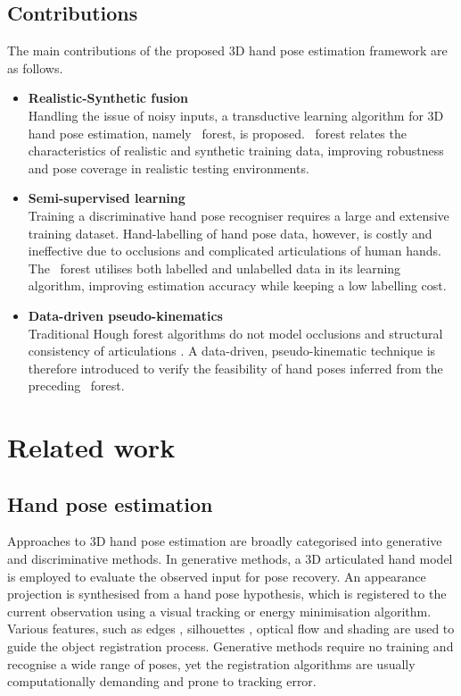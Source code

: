 \subsection{Contributions} 
The main contributions of the proposed 3D hand pose estimation framework are as follows. 

\begin{itemize}
\item{\textbf{Realistic-Synthetic fusion}}\\
Handling the issue of noisy inputs, a transductive learning algorithm for 3D hand pose estimation, namely \STR\ forest, is proposed. \STR\ forest relates the characteristics of realistic and synthetic training data, improving robustness and pose coverage in realistic testing environments.
\item{\textbf{Semi-supervised learning}}\\
Training a discriminative hand pose recogniser requires a large and extensive training dataset. Hand-labelling of hand pose data, however, is costly and ineffective due to occlusions and complicated articulations of human hands. 
The \STR\ forest utilises both labelled and unlabelled data in its learning algorithm, improving estimation accuracy while keeping a low labelling cost. 
\item{\textbf{Data-driven pseudo-kinematics}}\\
	Traditional Hough forest algorithms do not model occlusions and structural consistency of articulations \cite{Gall2009}. A data-driven, pseudo-kinematic technique is therefore introduced to verify the feasibility of hand poses inferred from the preceding \STR\ forest.  
\end{itemize} 

\section{Related work}

\subsection{Hand pose estimation}

Approaches to 3D hand pose estimation are broadly categorised into generative and discriminative methods. In generative methods, a 3D articulated hand model is employed to evaluate the observed input for pose recovery. An appearance projection is synthesised from a hand pose hypothesis, which is registered to the current observation using a visual tracking or energy minimisation algorithm. Various features, such as edges \cite{Guan2006}, silhouettes \cite{Wu2000}, optical flow \cite{Lu2003} and shading \cite{LaGorce2011} are used to guide the object registration process. Generative methods require no training and recognise a wide range of poses, yet the registration algorithms are usually computationally demanding and prone to tracking error.

